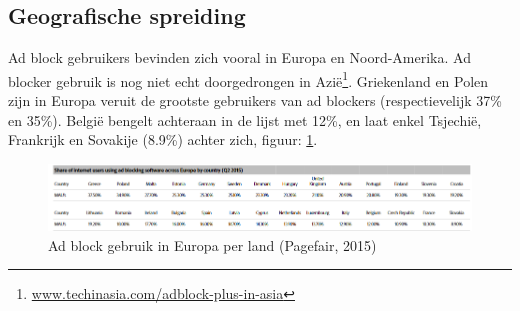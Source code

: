 \documentclass[pdftex,a4paper,12pt,twoside]{report}
\begin{document}
\subsection{Geografische spreiding}
\label{sec Geografische spreiding}
Ad block gebruikers bevinden zich vooral in Europa en Noord-Amerika. Ad blocker gebruik is nog niet echt doorgedrongen in Azië\footnote{\url{www.techinasia.com/adblock-plus-in-asia}}.
Griekenland en Polen zijn in Europa veruit de grootste gebruikers van ad blockers (respectievelijk 37\% en 35\%). België bengelt achteraan in de lijst met 12\%, en laat enkel Tsjechië, Frankrijk en Sovakije (8.9\%) achter zich, figuur: \ref{fig: ratespercountry}.
\begin{figure}[h!]
\centering


\includegraphics[width=16cm]{img/ratespercountry}
\caption{Ad block gebruik in Europa per land (Pagefair, 2015)}
\label{fig: ratespercountry}
\end{figure}
\end{document}
